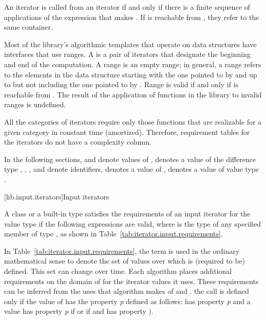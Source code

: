 \pnum
An iterator
is called
from an iterator
if and only if there is a finite sequence of applications of
the expression
that makes
.
If
is reachable from
,
they refer to the same container.

\pnum
Most of the library's algorithmic templates that operate on data structures have interfaces that use ranges.
A
is a pair of iterators that designate the beginning and end of the computation.
A range 
is an empty range;
in general, a range 
refers to the elements in the data structure starting with the one
pointed to by
and up to but not including the one pointed to by
.
Range 
is valid if and only if
is reachable from
.
The result of the application of functions in the library to invalid ranges is
undefined.

\pnum
All the categories of iterators require only those functions that are realizable for a given category in
constant time (amortized).
Therefore, requirement tables for the iterators do not have a complexity column.

\pnum
In the following sections,
and
denote values of
,
denotes a value of the difference type
,
,
,
and
denote identifiers,
denotes a value of
,
denotes a value of value type
.

[lib.input.iterators]{Input iterators}

\pnum
A class or a built-in type
satisfies the requirements of an input iterator for the value type
if the following expressions are valid, where  is the type of any
specified member of type ,
as shown in Table~\ref{tab:iterator.input.requirements}.

\pnum
In Table~\ref{tab:iterator.input.requirements}, the term
is used in the ordinary mathematical sense to denote
the set of values over which
\tcode{==} is (required to be) defined.
This set can change over time.
Each algorithm places additional requirements on the domain of
\tcode{==} for the iterator values it uses.
These requirements can be inferred from the uses that algorithm
makes of \tcode{==} and \tcode{!=}.
\enterexample
the call 
is defined only if the value of 
has the property \textit{p}
defined as follows:
 has property \textit{p}
and a value 
has property \textit{p}
if
or if
and
has property
).
\exitexample

